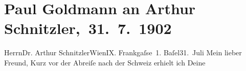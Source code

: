 

         
         \renewcommand{\erwaehntePersonen}{Personen: Paul Goldmann, Maurice Maeterlinck}
         \renewcommand{\erwaehnteInstitutionen}{Institutionen: Deutsches Theater Berlin, Schiller-Theater}
         \renewcommand{\erwaehnteOrte}{Orte: Basel, Berlin, Frankgasse 1, Schweiz, Wien}
         \renewcommand{\erwaehnteWerke}{Werke: Der Schleier der Beatrice. Schauspiel in fünf Akten, Monna Vanna. Schauspiel in drei Akten}
               \section[ Paul Goldmann an Arthur Schnitzler, 31. 7. 1902]{ Paul Goldmann an Arthur Schnitzler, 31. 7. 1902}\nopagebreak{}\rehead{ }\begin{ledgroupsized}[t]{13cm}\normalsize\beginnumbering \toendnotes[C]{\smallbreak\pagebreak[2]} 
\toendnotes[C]{\smallbreak}\pstart{}{\pb}Herrn\pend{}\pstart{}Dr. Arthur Schnitzler\pend{}\pstart{}Wien\pend{}\pstart{}IX. Frankgaſse 1.\pend{}{\bigskip}\pstart
           \centering{}{\pb}Baſel31. Juli\pend
           \pstart
           Mein lieber Freund, Kurz vor der Abreiſe nach der Schweiz erhielt ich Deine \label{K_L03216-1v}\label{K_L03216-1h}

\end{ledgroupsized}
